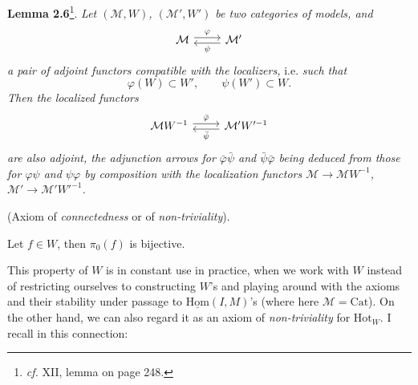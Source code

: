 \textbf{Lemma 2.6}\footnote{\textit{cf.} XII, lemma on page 248.}. \textit{Let $(\mathcal{M}, W)$, $(\mathcal{M}', W')$ be two categories of models, and}
\[
\begin{tikzcd}
\mathcal{M} \arrow[r, shift left, "\varphi"] & \mathcal{M}' \arrow[l, shift left, "\psi"]
\end{tikzcd}
\]
\textit{a pair of adjoint functors compatible with the localizers,} i.e. \textit{such that}
\[
\varphi(W) \subset W', \qquad \psi(W') \subset W.
\]
\textit{Then the localized functors}
\[
\begin{tikzcd}
\mathcal{M}W^{-1} \arrow[r, shift left, "\bar{\varphi}"] & \mathcal{M}'W'^{-1} \arrow[l, shift left, "\bar{\psi}"]
\end{tikzcd}
\]
\textit{are also adjoint, the adjunction arrows for $\bar{\varphi}\bar{\psi}$ and $\bar{\psi}\bar{\varphi}$ being deduced from those for $\varphi\psi$ and $\psi\varphi$ by composition with the localization functors $\mathcal{M} \longrightarrow \mathcal{M}W^{-1}$, $\mathcal{M}' \longrightarrow \mathcal{M}'W'^{-1}$.}

\begin{description}[leftmargin=7em, labelwidth=6em]
\item[Loc (5)] (Axiom of \textit{connectedness} or of \textit{non-triviality}).

Let $f \in W$, then $\pi_0(f)$ is bijective.
\end{description}

This property of $W$ is in constant use in practice, when we work with $W$ instead of restricting ourselves to constructing $W$'s and playing around with the axioms and their stability under passage to $\underline{\mathrm{Hom}}(I, M)$'s (where here $\mathcal{M} = \mathrm{Cat}$). On the other hand, we can also regard it as an axiom of \textit{non-triviality} for $\mathrm{Hot}_W$. I recall in this connection:

